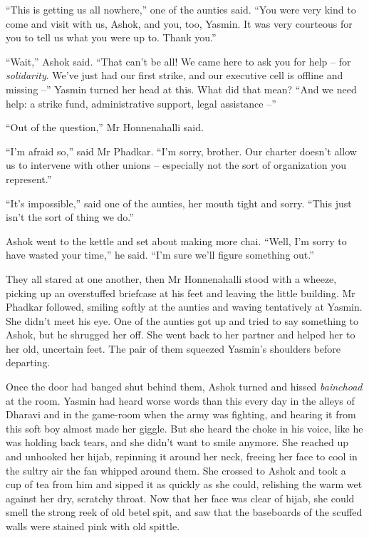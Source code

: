 ``This is getting us all nowhere,'' one of the aunties said. ``You
were very kind to come and visit with us, Ashok, and you, too,
Yasmin. It was very courteous for you to tell us what you were up
to. Thank you.''

``Wait,'' Ashok said. ``That can't be all! We came here to ask you for
help -- for \emph{solidarity}. We've just had our first strike, and
our executive cell is offline and missing --'' Yasmin turned her
head at this. What did that mean? ``And we need help: a strike fund,
administrative support, legal assistance --''

``Out of the question,'' Mr Honnenahalli said.

``I'm afraid so,'' said Mr Phadkar. ``I'm sorry, brother. Our charter
doesn't allow us to intervene with other unions -- especially not
the sort of organization you represent.''

``It's impossible,'' said one of the aunties, her mouth tight and
sorry. ``This just isn't the sort of thing we do.''

Ashok went to the kettle and set about making more chai. ``Well, I'm
sorry to have wasted your time,'' he said. ``I'm sure we'll figure
something out.''

They all stared at one another, then Mr Honnenahalli stood with a
wheeze, picking up an overstuffed briefcase at his feet and leaving
the little building. Mr Phadkar followed, smiling softly at the
aunties and waving tentatively at Yasmin. She didn't meet his eye.
One of the aunties got up and tried to say something to Ashok, but
he shrugged her off. She went back to her partner and helped her to
her old, uncertain feet. The pair of them squeezed Yasmin's
shoulders before departing.

Once the door had banged shut behind them, Ashok turned and hissed
\emph{bainchoad} at the room. Yasmin had heard worse words than
this every day in the alleys of Dharavi and in the game-room when
the army was fighting, and hearing it from this soft boy almost
made her giggle. But she heard the choke in his voice, like he was
holding back tears, and she didn't want to smile anymore. She
reached up and unhooked her hijab, repinning it around her neck,
freeing her face to cool in the sultry air the fan whipped around
them. She crossed to Ashok and took a cup of tea from him and
sipped it as quickly as she could, relishing the warm wet against
her dry, scratchy throat. Now that her face was clear of hijab, she
could smell the strong reek of old betel spit, and saw that the
baseboards of the scuffed walls were stained pink with old
spittle.

